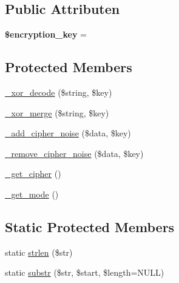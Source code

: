 \subsection*{Public Attributen}
\begin{DoxyCompactItemize}
\item 
\mbox{\label{class_c_i___encrypt_a35bbf76a5bcca90ca9b39368ed28121c}} 
{\bfseries \$encryption\+\_\+key} = \textquotesingle{}\textquotesingle{}
\end{DoxyCompactItemize}
\subsection*{Protected Members}
\begin{DoxyCompactItemize}
\item 
\mbox{\hyperlink{class_c_i___encrypt_aa0cee348c5cef9a3a06c22a92c38fd4f}{\+\_\+xor\+\_\+decode}} (\$string, \$key)
\item 
\mbox{\hyperlink{class_c_i___encrypt_aaf2644aeb5ec418eb4ddc2d70f372ada}{\+\_\+xor\+\_\+merge}} (\$string, \$key)
\item 
\mbox{\hyperlink{class_c_i___encrypt_ada423e99876a54e7bc33afc9899d01a2}{\+\_\+add\+\_\+cipher\+\_\+noise}} (\$data, \$key)
\item 
\mbox{\hyperlink{class_c_i___encrypt_a35c2675b85803d42231d1f8353fa8dac}{\+\_\+remove\+\_\+cipher\+\_\+noise}} (\$data, \$key)
\item 
\mbox{\hyperlink{class_c_i___encrypt_a663ee049f0b7596a0e4925a3eb2db062}{\+\_\+get\+\_\+cipher}} ()
\item 
\mbox{\hyperlink{class_c_i___encrypt_a8c6526d9458754249ee7268ead883a6c}{\+\_\+get\+\_\+mode}} ()
\end{DoxyCompactItemize}
\subsection*{Static Protected Members}
\begin{DoxyCompactItemize}
\item 
static \mbox{\hyperlink{class_c_i___encrypt_a4c29a687d4ed62c26a10e41d98930d5f}{strlen}} (\$str)
\item 
static \mbox{\hyperlink{class_c_i___encrypt_a101caef57ef0b165da5747e2c2e6c9dc}{substr}} (\$str, \$start, \$length=N\+U\+LL)
\end{DoxyCompactItemize}
